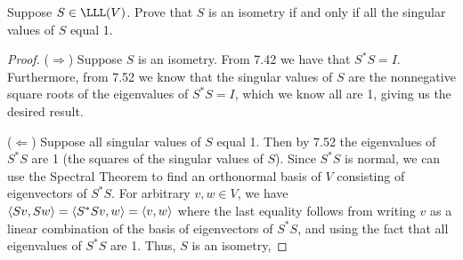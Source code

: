 \begin{exercise}{15}
  Suppose $S\in\LLL(V)$. Prove that $S$ is an isometry if and only if all  the singular values of $S$ equal 1.
\end{exercise}
\begin{proof}
 ($\Rightarrow$) Suppose $S$ is an isometry. From 7.42 we have that $S^\ast S =I$. Furthermore, from 7.52 we know that the singular values of $S$ are the nonnegative square roots of the eigenvalues of $S^\ast S =I$, which we know all are 1, giving us the desired result.

 ($\Leftarrow$) Suppose all singular values of $S$ equal 1. Then by 7.52 the eigenvalues of $S^\ast S$ are 1 (the squares of the singular values of $S$). Since $S^\ast S$ is normal, we can use the Spectral Theorem to find an orthonormal basis of $V$ consisting of eigenvectors of $S^\ast S$. For arbitrary $v,w\in V$, we have $\langle Sv,Sw\rangle =\langle S^\ast Sv,w\rangle =\langle v,w\rangle$ where the last equality follows from writing $v$ as a linear combination of the basis of eigenvectors of $S^\ast S$, and using the fact that all eigenvalues of $S^\ast S$ are 1. Thus, $S$ is an isometry,
\end{proof}

